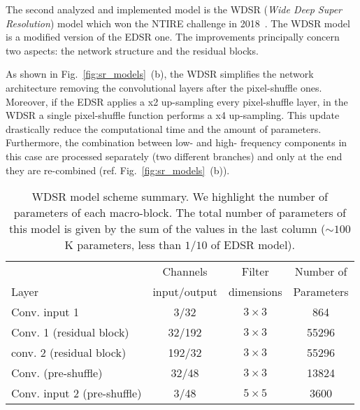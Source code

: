 \documentclass{standalone}
\begin{document}
The second analyzed and implemented model is the WDSR (\emph{Wide Deep Super Resolution}) model which won the NTIRE challenge in 2018~\cite{wdsr}.
The WDSR model is a modified version of the EDSR one.
The improvements principally concern two aspects: the network structure and the residual blocks.

As shown in Fig.~\ref{fig:sr_models}~(b), the WDSR simplifies the network architecture removing the convolutional layers after the pixel-shuffle ones.
Moreover, if the EDSR applies a x2 up-sampling every pixel-shuffle layer, in the WDSR a single pixel-shuffle function performs a x4 up-sampling.
This update drastically reduce the computational time and the amount of parameters.
Furthermore, the combination between low- and high- frequency components in this case are processed separately (two different branches) and only at the end they are re-combined (ref. Fig.~\ref{fig:sr_models}~(b)).

\begin{table}[htbp]
\centering
\begin{tabular}{lccc}
\hline \rowcolor{darkgrayrow}
                            &  Channels     & Filter     & Number of    \\
\rowcolor{darkgrayrow}
Layer                       & input/output  & dimensions & Parameters   \\
\hline
Conv. input 1               & 3/32       & $3\times3$   & 864     \\
Conv. 1 (residual block)    & 32/192     & $3\times3$   & 55296   \\
conv. 2 (residual block)    & 192/32     & $3\times3$   & 55296   \\
Conv. (pre-shuffle)         & 32/48      & $3\times3$   & 13824   \\
Conv. input 2 (pre-shuffle) & 3/48       & $5\times5$   & 3600    \\
\hline
\end{tabular}
\caption{WDSR model scheme summary.
We highlight the number of parameters of each macro-block.
The total number of parameters of this model is given by the sum of the values in the last column ($\sim100$K parameters, less than $1/10$ of EDSR model).
}
\label{tab:wdsr}
\end{table}
\end{document}
